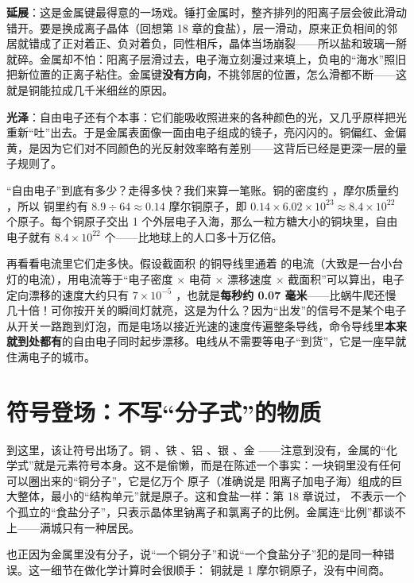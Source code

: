 \textbf{延展}：这是金属键最得意的一场戏。锤打金属时，整齐排列的阳离子层会彼此滑动错开。要是换成离子晶体（回想第 18 章的食盐），层一滑动，原来正负相间的邻居就错成了正对着正、负对着负，同性相斥，晶体当场崩裂——所以盐和玻璃一掰就碎。金属却不怕：阳离子层滑过去，电子海立刻漫过来填上，负电的“海水”照旧把新位置的正离子粘住。金属键\textbf{没有方向}，不挑邻居的位置，怎么滑都不断——这就是铜能拉成几千米细丝的原因。

\textbf{光泽}：自由电子还有个本事：它们能吸收照进来的各种颜色的光，又几乎原样把光重新“吐”出去。于是金属表面像一面由电子组成的镜子，亮闪闪的。铜偏红、金偏黄，是因为它们对不同颜色的光反射效率略有差别——这背后已经是更深一层的量子规则了。

\begin{qiaoliang}
“自由电子”到底有多少？走得多快？我们来算一笔账。铜的密度约 ，摩尔质量约 ，所以  铜里约有 $8.9\div 64\approx 0.14$ 摩尔铜原子，即 $0.14\times 6.02\times 10^{23}\approx 8.4\times 10^{22}$ 个原子。每个铜原子交出 1 个外层电子入海，那么一粒方糖大小的铜块里，自由电子就有 $8.4\times 10^{22}$ 个——比地球上的人口多十万亿倍。

再看看电流里它们走多快。假设截面积  的铜导线里通着  的电流（大致是一台小台灯的电流），用电流等于“电子密度 × 电荷 × 漂移速度 × 截面积”可以算出，电子定向漂移的速度大约只有 $7\times 10^{-5}$ ，也就是\textbf{每秒约 0.07 毫米}——比蜗牛爬还慢几十倍！可你按开关的瞬间灯就亮，这是为什么？因为“出发”的信号不是某个电子从开关一路跑到灯泡，而是电场以接近光速的速度传遍整条导线，命令导线里\textbf{本来就到处都有}的自由电子同时起步漂移。电线从不需要等电子“到货”，它是一座早就住满电子的城市。
\end{qiaoliang}

\section{符号登场：不写“分子式”的物质}

到这里，该让符号出场了。铜 、铁 、铝 、银 、金 ——注意到没有，金属的“化学式”就是元素符号本身。这不是偷懒，而是在陈述一个事实：一块铜里没有任何可以圈出来的“铜分子”，它是亿万个  原子（准确说是  阳离子加电子海）组成的巨大整体，最小的“结构单元”就是原子。这和食盐一样：第 18 章说过， 不表示一个个孤立的“食盐分子”，只表示晶体里钠离子和氯离子的比例。金属连“比例”都谈不上——满城只有一种居民。

也正因为金属里没有分子，说“一个铜分子”和说“一个食盐分子”犯的是同一种错误。这一细节在做化学计算时会很顺手： 铜就是 1 摩尔铜原子，没有中间商。


